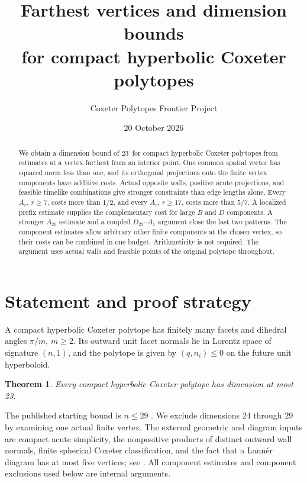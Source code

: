 \documentclass[11pt]{article}
\title{Farthest vertices and dimension bounds\\
for compact hyperbolic Coxeter polytopes}
\author{Coxeter Polytopes Frontier Project}
\date{20 October 2026}
\newtheorem{theorem}{Theorem}[section]
\theoremstyle{remark}
\newcommand{\CompactBound}{23}
\begin{document}
\maketitle

\begin{abstract}
We obtain a dimension bound of \CompactBound\ for compact hyperbolic
Coxeter polytopes from estimates at a vertex farthest from an interior
point. One common spatial vector has squared norm less than one, and
its orthogonal projections onto the finite vertex components have
additive costs. Actual opposite walls, positive acute projections,
and feasible timelike combinations give stronger constraints than
edge lengths alone. Every $A_r$, $r\ge7$, costs more than $1/2$,
and every $A_r$, $r\ge17$, costs more than $5/7$.
A localized prefix estimate supplies the complementary cost for
large $B$ and $D$ components. A stronger $A_{20}$ estimate and a
coupled $D_{23}$--$A_1$ argument close the last two patterns.
The component estimates allow arbitrary other finite components at
the chosen vertex, so their costs can be combined in one budget.
Arithmeticity is not required. The argument uses actual walls and
feasible points of the original polytope throughout.
\end{abstract}

\section{Statement and proof strategy}\label{sec:scope}

A compact hyperbolic Coxeter polytope has finitely many facets and
dihedral angles $\pi/m$, $m\ge2$. Its outward unit facet normals lie
in Lorentz space of signature $(n,1)$, and the polytope is given by
$(q,n_i)\le0$ on the future unit hyperboloid.

\begin{theorem}\label{thm:main}
Every compact hyperbolic Coxeter polytope has dimension at most
\CompactBound.
\end{theorem}

The published starting bound is $n\le29$ \cite{Vin84}. We exclude
dimensions $24$ through $29$ by examining one actual finite vertex. The
external geometric and diagram inputs are compact acute simplicity,
the nonpositive products of distinct outward wall normals, finite
spherical Coxeter classification, and the fact that a Lann\'er diagram
has at most five vertices; see \cite{Vin85}. All component estimates
and component exclusions used below are internal arguments.
\end{document}
